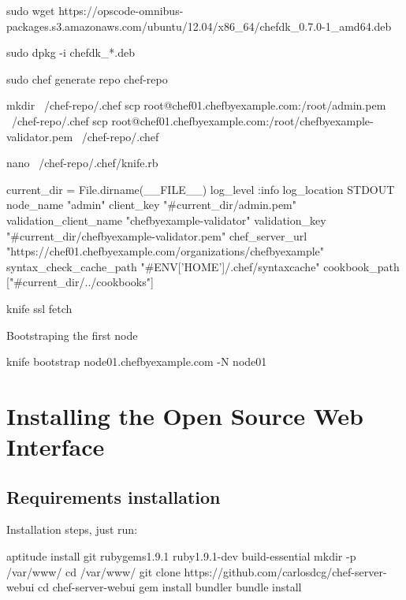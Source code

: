\begin{codelisting}
\label{code:}
\codecaption{}
\begin{code}

sudo wget https://opscode-omnibus-packages.s3.amazonaws.com/ubuntu/12.04/x86_64/chefdk_0.7.0-1_amd64.deb

sudo dpkg -i chefdk_*.deb

sudo chef generate repo chef-repo

mkdir ~/chef-repo/.chef
scp root@chef01.chefbyexample.com:/root/admin.pem ~/chef-repo/.chef
scp root@chef01.chefbyexample.com:/root/chefbyexample-validator.pem ~/chef-repo/.chef

nano ~/chef-repo/.chef/knife.rb


current_dir = File.dirname(__FILE__)
log_level                :info
log_location             STDOUT
node_name                "admin"
client_key               "#{current_dir}/admin.pem"
validation_client_name   "chefbyexample-validator"
validation_key           "#{current_dir}/chefbyexample-validator.pem"
chef_server_url          "https://chef01.chefbyexample.com/organizations/chefbyexample"
syntax_check_cache_path  "#{ENV['HOME']}/.chef/syntaxcache"
cookbook_path            ["#{current_dir}/../cookbooks"]


knife ssl fetch

Bootstraping the first node

knife bootstrap node01.chefbyexample.com -N node01


\end{code}
\end{codelisting}

\section{Installing the Open Source Web Interface}

\subsection{Requirements installation}

Installation steps, just run:
\begin{codelisting}
\label{code:}
\codecaption{}
\begin{code}
aptitude install git rubygems1.9.1 ruby1.9.1-dev build-essential
mkdir -p /var/www/
cd /var/www/
git clone https://github.com/carlosdcg/chef-server-webui
cd chef-server-webui
gem install bundler
bundle install
\end{code}
\end{codelisting}

